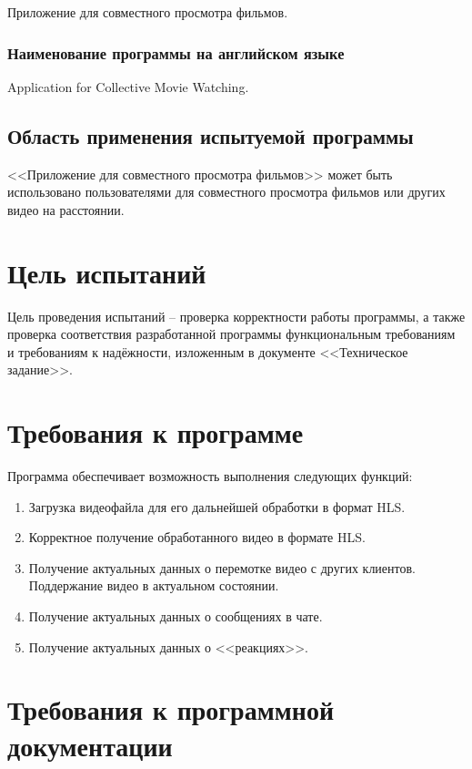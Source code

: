 \documentclass{../../includes/TechDocMultiAuthors}
\begin{document}
    Приложение для совместного просмотра фильмов.

    \subsubsection{Наименование программы на английском языке}

    Application for Collective Movie Watching.

    \subsection{Область применения испытуемой программы}

    <<Приложение для совместного просмотра фильмов>> может быть использовано пользователями для совместного просмотра фильмов или других видео на расстоянии.

    \section{Цель испытаний}

    Цель проведения испытаний -- проверка корректности работы программы, а также проверка соответствия разработанной программы функциональным требованиям и требованиям к надёжности, изложенным в документе <<Техническое задание>>.

    \section{Требования к программе}

    Программа обеспечивает возможность выполнения следующих функций:
    \begin{enumerate}
        \item Загрузка видеофайла для его дальнейшей обработки в формат HLS.
        \item Корректное получение обработанного видео в формате HLS.
        \item Получение актуальных данных о перемотке видео с других клиентов.
        Поддержание видео в актуальном состоянии.
        \item Получение актуальных данных о сообщениях в чате.
        \item Получение актуальных данных о <<реакциях>>.
    \end{enumerate}

    \section{Требования к программной документации}
\end{document}
